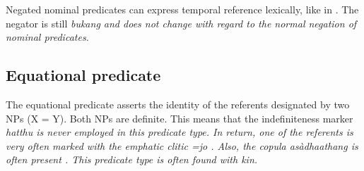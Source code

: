 % 
% 
% 
% 

Negated nominal predicates can express temporal reference lexically, like  in . The negator is still \em bukang \em and does not change with regard to the normal negation of nominal predicates.


\subsection{Equational predicate}\label{sec:pred:Equationalpredicate}
The equational predicate   asserts the identity of the referents designated by two NPs (X = Y). Both NPs are  definite. This means that the indefiniteness marker \em hatthu \em is never employed in this predicate type. In return, one of the referents is very often marked with the emphatic clitic \em =jo \em {}. Also, the copula \em asàdhaathang \em is often present . This predicate type is often found with kin.

 


